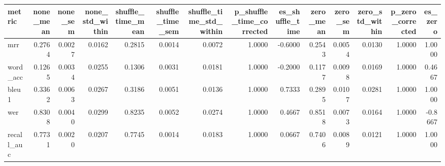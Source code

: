\begin{tabular}{lrrrrrrrrrrrrr}
\toprule
metric & none_mean & none_sem & none_std_within & shuffle_time_mean & shuffle_time_sem & shuffle_time_std_within & p_shuffle_time_corrected & es_shuffle_time & zero_mean & zero_sem & zero_std_within & p_zero_corrected & es_zero \\
\midrule
mrr & 0.2764 & 0.0027 & 0.0162 & 0.2815 & 0.0014 & 0.0072 & 1.0000 & -0.6000 & 0.2543 & 0.0054 & 0.0130 & 1.0000 & 1.0000 \\
word_acc & 0.1265 & 0.0034 & 0.0255 & 0.1306 & 0.0031 & 0.0181 & 1.0000 & -0.2000 & 0.1177 & 0.0098 & 0.0169 & 1.0000 & 0.4667 \\
bleu1 & 0.3362 & 0.0063 & 0.0267 & 0.3186 & 0.0051 & 0.0136 & 1.0000 & 0.7333 & 0.2895 & 0.0107 & 0.0281 & 1.0000 & 1.0000 \\
wer & 0.8308 & 0.0040 & 0.0299 & 0.8235 & 0.0052 & 0.0274 & 1.0000 & 0.4667 & 0.8518 & 0.0073 & 0.0164 & 1.0000 & -0.8667 \\
recall_auc & 0.7731 & 0.0020 & 0.0207 & 0.7745 & 0.0014 & 0.0183 & 1.0000 & 0.0667 & 0.7406 & 0.0089 & 0.0121 & 1.0000 & 1.0000 \\
\bottomrule
\end{tabular}
